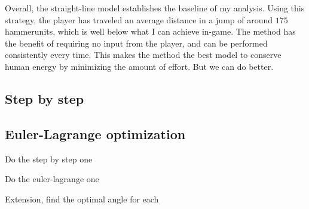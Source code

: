 Overall, the straight-line model establishes the baseline of my analysis. Using this strategy, the player has traveled an average distance in a jump of around $175$ hammerunits, which is well below what I can achieve in-game. The method has the benefit of requiring no input from the player, and can be performed consistently every  time. This makes the method the best model to conserve human energy by minimizing the amount of effort. But we can do better.





\subsection{Step by step}


\subsection{Euler-Lagrange optimization}







Do the step by step one

Do the euler-lagrange one

Extension, find the optimal angle for each

